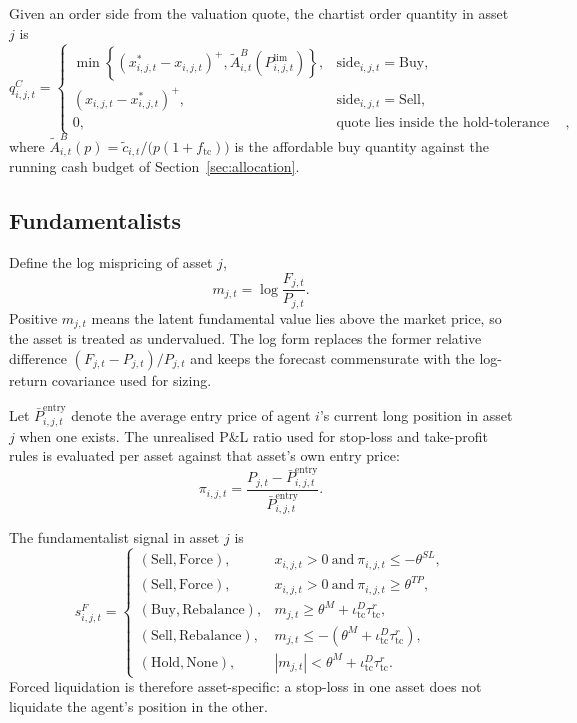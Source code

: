 \documentclass[12pt, a4paper]{article}
\newcommand{\pospart}[1]{\left(#1\right)^{+}}
\begin{document}
    Given an order side from the valuation quote, the chartist order quantity in
    asset \(j\) is
    \[
        q_{i,j,t}^{C}=
        \begin{cases}
            \min\left\{\pospart{x_{i,j,t}^{\ast}-x_{i,j,t}},\tilde A_{i,t}^{B}(P_{i,j,t}^{\text{lim}})\right\}, & \mathrm{side}_{i,j,t}=\mathrm{Buy},\\[1.2ex]
            \pospart{x_{i,j,t}-x_{i,j,t}^{\ast}}, & \mathrm{side}_{i,j,t}=\mathrm{Sell},\\
            0, & \text{quote lies inside the hold-tolerance band},
        \end{cases}
    \]
    where \(\tilde A_{i,t}^{B}(p)=\tilde c_{i,t}/\bigl(p(1+f_{\mathrm{tc}})\bigr)\)
    is the affordable buy quantity against the running cash budget of
    Section~\ref{sec:allocation}.

    \subsection{Fundamentalists}
    Define the log mispricing of asset \(j\),
    \[
        m_{j,t}=\log\frac{F_{j,t}}{P_{j,t}}.
    \]
    Positive \(m_{j,t}\) means the latent fundamental value lies above the market
    price, so the asset is treated as undervalued. The log form replaces the
    former relative difference \((F_{j,t}-P_{j,t})/P_{j,t}\) and keeps the
    forecast commensurate with the log-return covariance used for sizing.

    Let \(\bar P_{i,j,t}^{\text{entry}}\) denote the average entry price of agent
    \(i\)'s current long position in asset \(j\) when one exists. The unrealised
    P\&L ratio used for stop-loss and take-profit rules is evaluated per asset
    against that asset's own entry price:
    \[
        \pi_{i,j,t}=\frac{P_{j,t}-\bar P_{i,j,t}^{\text{entry}}}{\bar P_{i,j,t}^{\text{entry}}}.
    \]

    The fundamentalist signal in asset \(j\) is
    \[
        s_{i,j,t}^{F}=
        \begin{cases}
            (\mathrm{Sell},\mathrm{Force}), & x_{i,j,t}>0\ \text{and}\ \pi_{i,j,t}\le -\theta^{SL},\\
        (\mathrm{Sell},\mathrm{Force}), & x_{i,j,t}>0\ \text{and}\ \pi_{i,j,t}\ge \theta^{TP},\\
        (\mathrm{Buy},\mathrm{Rebalance}), & m_{j,t}\ge \theta^{M}+\iota_{\mathrm{tc}}^D\tau_{\mathrm{tc}}^{r},\\
        (\mathrm{Sell},\mathrm{Rebalance}), & m_{j,t}\le -\left(\theta^{M}+\iota_{\mathrm{tc}}^D\tau_{\mathrm{tc}}^{r}\right),\\
        (\mathrm{Hold},\mathrm{None}), & |m_{j,t}|<\theta^{M}+\iota_{\mathrm{tc}}^D\tau_{\mathrm{tc}}^{r}.
        \end{cases}
    \]
    Forced liquidation is therefore asset-specific: a stop-loss in one asset does
    not liquidate the agent's position in the other.
\end{document}
